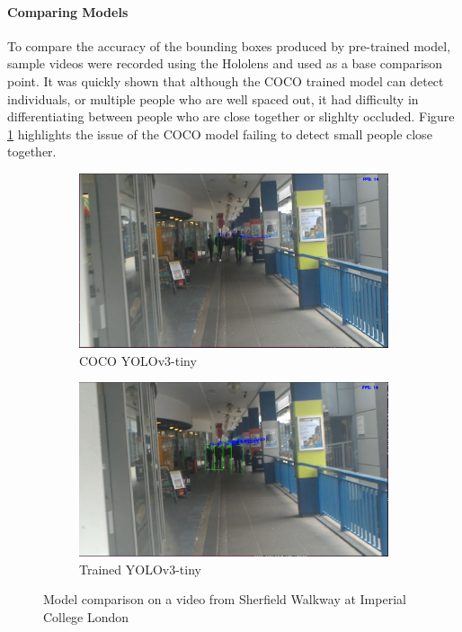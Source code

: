 \paragraph{Comparing Models} To compare the accuracy of the bounding boxes produced by pre-trained model, sample videos were recorded using the Hololens and used as a base comparison point. It was quickly shown that although the COCO trained model can detect individuals, or multiple people who are well spaced out, it had difficulty in differentiating between people who are close together or slighlty occluded. Figure \ref{fig:yoloCHvsCoco} highlights the issue of the COCO model failing to detect small people close together.

\begin{figure}[ht]
	\begin{subfigure}[b]{.5\textwidth}
		\centering
		\includegraphics[width=0.95\linewidth]{img/chapter4_analysis/yoloCoco.png}
		\caption{COCO YOLOv3-tiny}
	\end{subfigure}%
	\hspace{\fill} 
	\begin{subfigure}[b]{.5\textwidth}
		\centering
		\includegraphics[width=0.95\linewidth]{img/chapter4_analysis/yoloCH.png}
		\caption{Trained YOLOv3-tiny}
	\end{subfigure}
	\vspace{-2\baselineskip}
	\begin{center}
		\caption{Model comparison on a video from Sherfield Walkway at Imperial College London}
		\label{fig:yoloCHvsCoco}
	\end{center}
	\vspace{-2\baselineskip}
\end{figure}

